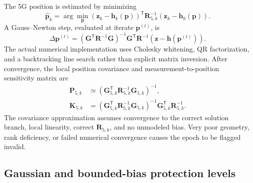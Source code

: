 \documentclass[pdflatex,sn-mathphys-num]{sn-jnl}
\newcommand{\vect}[1]{\boldsymbol{#1}}
\newcommand{\mat}[1]{\mathbf{#1}}
\newcommand{\trans}{^{\mathsf T}}
\begin{document}
The 5G position is estimated by minimizing
\begin{equation}\label{eq:wls5g}
 \hat{\vect{p}}_k=\arg\min_{\vect{p}}
 (\vect{z}_k-\vect{h}_k(\vect{p}))\trans
 \mat{R}_{5,k}^{-1}
 (\vect{z}_k-\vect{h}_k(\vect{p})).
\end{equation}
A Gauss--Newton step, evaluated at iterate $\vect{p}^{(t)}$, is
\begin{equation}\label{eq:gnstep}
 \Delta\vect{p}^{(t)}=
 \left(\mat{G}^{\mathsf T}\mat{R}^{-1}\mat{G}\right)^{-1}
 \mat{G}\trans\mat{R}^{-1}
 \left(\vect{z}-\vect{h}(\vect{p}^{(t)})\right).
\end{equation}
The actual numerical implementation uses Cholesky whitening, QR
factorization, and a backtracking line search rather than explicit
matrix inversion. After convergence, the local position covariance
and measurement-to-position sensitivity matrix are
\begin{align}
 \mat{P}_{5,k}&\simeq
 (\mat{G}_{5,k}\trans\mat{R}_{5,k}^{-1}\mat{G}_{5,k})^{-1},
 \label{eq:P5g}\\
 \mat{K}_{5,k}&=
 (\mat{G}_{5,k}\trans\mat{R}_{5,k}^{-1}\mat{G}_{5,k})^{-1}
 \mat{G}_{5,k}\trans\mat{R}_{5,k}^{-1}.\label{eq:K5g}
\end{align}
The covariance approximation assumes convergence to the correct solution
branch, local linearity, correct $\mat{R}_{5,k}$, and no unmodeled bias.
Very poor geometry, rank deficiency, or failed numerical convergence
causes the epoch to be flagged invalid.

\subsection{Gaussian and bounded-bias protection levels}
\end{document}
